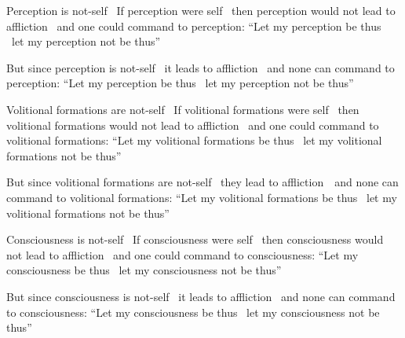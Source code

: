 \begin{english-only-hang}
  Perception is not-self \breathmark\ If perception were self \breathmark\ then perception would not lead to affliction \breathmark\ and one could command to perception: ``Let my perception be thus \breathmark\ let my perception not be thus''
\end{english-only-hang}
\begin{english-only-hangtogether}
  But since perception is not-self \breathmark\ it leads to affliction \breathmark\ and none can command to perception: ``Let my perception be thus \breathmark\ let my perception not be thus''
\end{english-only-hangtogether}

\begin{english-only-hang}
  Volitional formations are not-self \breathmark\ If volitional formations were self \breathmark\ then volitional formations would not lead to affliction \breathmark\ and one could command to volitional formations: ``Let my volitional formations be thus \breathmark\ let my volitional formations not be thus''
\end{english-only-hang}
\begin{english-only-hangtogether}
  But since volitional formations are not-self \breathmark\ they lead to \mbox{affliction}~\breathmark\ and none can command to volitional formations: ``Let my volitional formations be thus \breathmark\ let my volitional formations not be thus''
\end{english-only-hangtogether}

\begin{english-only-hang}
  Consciousness is not-self \breathmark\ If consciousness were self \breathmark\ then consciousness would not lead to affliction \breathmark\ and one could command to consciousness: ``Let my consciousness be thus \breathmark\ let my consciousness not be thus''
\end{english-only-hang}
\begin{english-only-hangtogether}
  But since consciousness is not-self \breathmark\ it leads to affliction \breathmark\ and none can command to consciousness: ``Let my consciousness be thus \breathmark\ let my consciousness not be thus''
\end{english-only-hangtogether}


